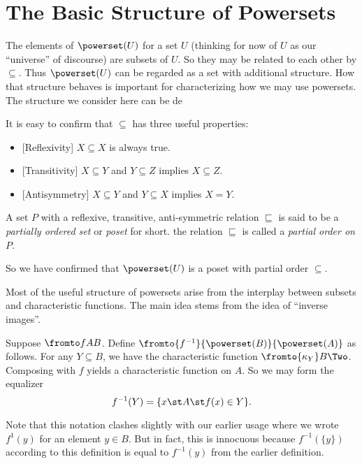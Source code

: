 \section{The Basic Structure of Powersets}

The elements of $\powerset(U)$ for a set $U$ (thinking for now of $U$ as our
``universe'' of discourse) are subsets of $U$.
So they may be related to each other by $\subseteq$. 
Thus $\powerset(U)$ can be regarded as a set with additional structure. 
How that structure behaves is important for characterizing how we may use powersets. The structure we consider here can be de

It is easy to confirm that $\subseteq$ has three useful properties:
\begin{itemize}
	\item{}[Reflexivity] $X\subseteq X$ is always true.
	\item{}[Transitivity] $X\subseteq Y$ and $Y\subseteq Z$ implies $X\subseteq Z$.
	\item{}[Antisymmetry] $X\subseteq Y$ and $Y\subseteq X$ implies $X=Y$.
\end{itemize}

\begin{defn}
	A set $P$ with a reflexive, transitive, anti-symmetric relation $\sqsubseteq$ is said to be a \emph{partially ordered set} or \emph{poset} for short. the relation $\sqsubseteq$ is called a \emph{partial order on $P$}. 
\end{defn}

So we have confirmed that $\powerset(U)$ is a poset with partial order $\subseteq$.

Most of the useful structure of powersets arise from the interplay between
subsets and characteristic functions. The main idea stems from the idea of ``inverse images''.

\begin{defn}
	Suppose $\fromto fAB$. Define $\fromto {f^{-1}}{\powerset(B)}{\powerset(A)}$ as follows. For any $Y\subseteq B$, we have the characteristic function $\fromto {\kappa_Y}B\Two$. 
	Composing with $f$ yields a characteristic function on $A$. So we may form the
	equalizer 
	\[ f^{-1}(Y) = \{x\st A\st f(x)\in Y\}.\] 
\end{defn}
Note that this notation clashes slightly with our earlier usage where we wrote $f^{1}(y)$ for an element $y\in B$. But in fact, this is innocuous because 
$f^{-1}(\{y\})$ according to this definition is equal to $f^{-1}(y)$ from the earlier definition.
	
